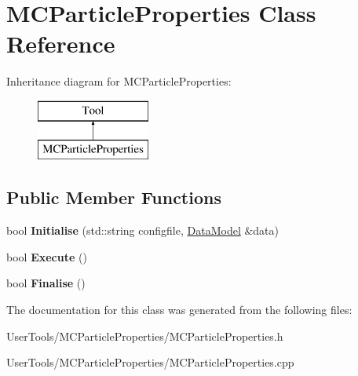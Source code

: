 \hypertarget{classMCParticleProperties}{\section{M\-C\-Particle\-Properties Class Reference}
\label{classMCParticleProperties}
}
Inheritance diagram for M\-C\-Particle\-Properties\-:\begin{figure}[H]
\begin{center}
\leavevmode
\includegraphics[height=2.000000cm]{classMCParticleProperties}
\end{center}
\end{figure}
\subsection*{Public Member Functions}
\begin{DoxyCompactItemize}
\item 
\hypertarget{classMCParticleProperties_aeb42d506b628e71bad8d15c6d20b7728}{bool {\bfseries Initialise} (std\-::string configfile, \hyperlink{classDataModel}{Data\-Model} \&data)}\label{classMCParticleProperties_aeb42d506b628e71bad8d15c6d20b7728}

\item 
\hypertarget{classMCParticleProperties_a93cf4884b81b864d9a40ae53689ad9f8}{bool {\bfseries Execute} ()}\label{classMCParticleProperties_a93cf4884b81b864d9a40ae53689ad9f8}

\item 
\hypertarget{classMCParticleProperties_a6ed9e609a5194be6d1c2461759b086f1}{bool {\bfseries Finalise} ()}\label{classMCParticleProperties_a6ed9e609a5194be6d1c2461759b086f1}

\end{DoxyCompactItemize}


The documentation for this class was generated from the following files\-:\begin{DoxyCompactItemize}
\item 
User\-Tools/\-M\-C\-Particle\-Properties/M\-C\-Particle\-Properties.\-h\item 
User\-Tools/\-M\-C\-Particle\-Properties/M\-C\-Particle\-Properties.\-cpp\end{DoxyCompactItemize}
